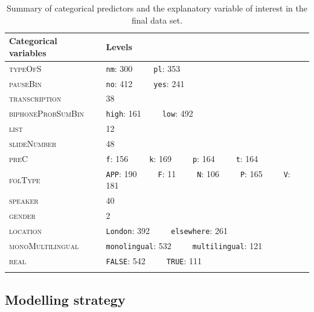 \begin{table}\fontsize{10}{11}
\caption{Summary of categorical predictors and the explanatory variable of interest in the final data set.}
\label{tab:5.3}
\centering
\begin{tabular}{ll}
\lsptoprule
Categorical variables & Levels                                                   \\
\midrule
\textsc{typeOfS}               & \texttt{nm}: 300~ ~ ~ \texttt{pl}: 353                                     \\
\textsc{pauseBin}              & \texttt{no}: 412~ ~ ~ \texttt{yes}: 241                                    \\
\textsc{transcription}         & 38                                                       \\
\textsc{biphoneProbSumBin}     & \texttt{high}: 161~ ~ ~ \texttt{low}: 492                                  \\
\textsc{list}                  & 12                                                       \\
\textsc{slideNumber}           & 48                                                       \\
\textsc{preC}                  & \texttt{f}: 156~ ~ ~ \texttt{k}: 169~ ~ ~ \texttt{p}: 164~ ~ ~ \texttt{t}: 164               \\
\textsc{folType}               & \texttt{APP}: 190~ ~ ~ \texttt{F}: 11~ ~ ~ \texttt{N}: 106~ ~ ~ \texttt{P}: 165~ ~ ~ \texttt{V}: 181  \\
\textsc{speaker}               & 40                                                       \\
\textsc{gender}                & 2                                                        \\
\textsc{location}              & \texttt{London}: 392~ ~ ~ \texttt{elsewhere}: 261                          \\
\textsc{monoMultilingual}      & \texttt{monolingual}: 532~ ~ ~ \texttt{multilingual}: 121                  \\
\textsc{real}                  & \texttt{FALSE}: 542~ ~ ~ \texttt{TRUE}: 111                               \\
\lspbottomrule
\end{tabular}
\end{table}

\subsection{Modelling strategy}\label{section05_2_3}

